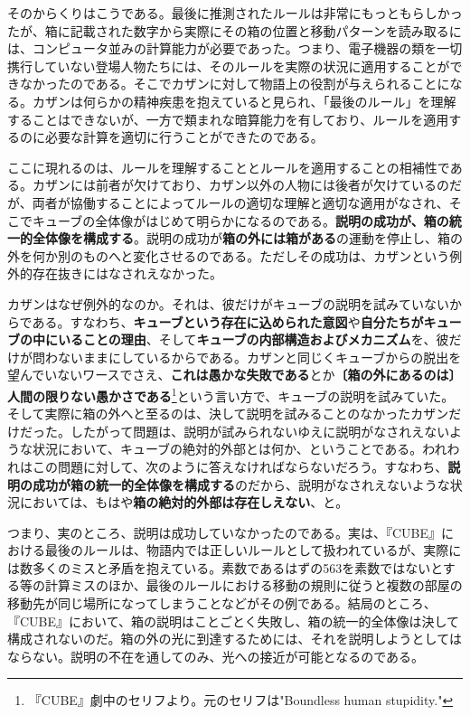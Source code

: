 \documentclass[9pt,b5j,twoside,twocolumn]{utarticle}
\begin{document}
そのからくりはこうである。最後に推測されたルールは非常にもっともらしかったが、箱に記載された数字から実際にその箱の位置と移動パターンを読み取るには、コンピュータ並みの計算能力が必要であった。つまり、電子機器の類を一切携行していない登場人物たちには、そのルールを実際の状況に適用することができなかったのである。そこでカザンに対して物語上の役割が与えられることになる。カザンは何らかの精神疾患を抱えていると見られ、「最後のルール」を理解することはできないが、一方で類まれな暗算能力を有しており、ルールを適用するのに必要な計算を適切に行うことができたのである。

ここに現れるのは、ルールを理解することとルールを適用することの相補性である。カザンには前者が欠けており、カザン以外の人物には後者が欠けているのだが、両者が協働することによってルールの適切な理解と適切な適用がなされ、そこでキューブの全体像がはじめて明らかになるのである。\textbf{説明の成功が、箱の統一的全体像を構成する}。説明の成功が\textbf{箱の外には箱がある}の運動を停止し、箱の外を何か別のものへと変化させるのである。ただしその成功は、カザンという例外的存在抜きにはなされえなかった。

カザンはなぜ例外的なのか。それは、彼だけがキューブの説明を試みていないからである。すなわち、\textbf{キューブという存在に込められた意図}や\textbf{自分たちがキューブの中にいることの理由}、そして\textbf{キューブの内部構造およびメカニズム}を、彼だけが問わないままにしているからである。カザンと同じくキューブからの脱出を望んでいないワースでさえ、\textbf{これは愚かな失敗である}とか\textbf{〔箱の外にあるのは〕人間の限りない愚かさである}\footnote{『CUBE』劇中のセリフより。元のセリフは"Boundless human stupidity."}という言い方で、キューブの説明を試みていた。そして実際に箱の外へと至るのは、決して説明を試みることのなかったカザンだけだった。したがって問題は、説明が試みられないゆえに説明がなされえないような状況において、キューブの絶対的外部とは何か、ということである。われわれはこの問題に対して、次のように答えなければならないだろう。すなわち、\textbf{説明の成功が箱の統一的全体像を構成する}のだから、説明がなされえないような状況においては、もはや\textbf{箱の絶対的外部は存在しえない}、と。


つまり、実のところ、説明は成功していなかったのである。実は、『CUBE』における最後のルールは、物語内では正しいルールとして扱われているが、実際には数多くのミスと矛盾を抱えている。素数であるはずの563を素数ではないとする等の計算ミスのほか、最後のルールにおける移動の規則に従うと複数の部屋の移動先が同じ場所になってしまうことなどがその例である。結局のところ、『CUBE』において、箱の説明はことごとく失敗し、箱の統一的全体像は決して構成されないのだ。箱の外の光に到達するためには、それを説明しようとしてはならない。説明の不在を通してのみ、光への接近が可能となるのである。
\end{document}
